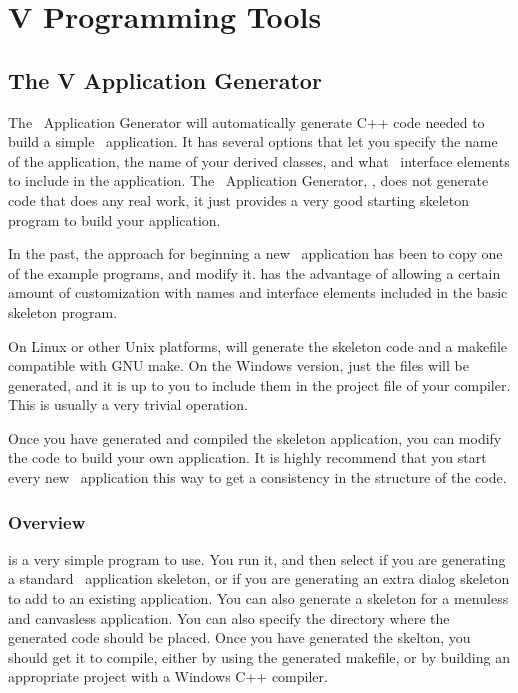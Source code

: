 
\chapter{V Programming Tools}

\section{The V Application Generator}

The \V\ Application Generator will automatically generate
C++ code needed to build a simple \V\ application. It has
several options that let you specify the name of the
application, the name of your derived classes, and what
\V\ interface elements to include in the application.
The \V\ Application Generator, , does not generate code that
does any real work, it just provides a very good starting
skeleton program to build your application.

In the past, the approach for beginning a new \V\ application
has been to copy one of the example programs, and modify
it.  has the advantage of allowing a certain amount
of customization with names and interface elements included
in the basic skeleton program.

On Linux or other Unix platforms,  will generate
the skeleton code and a makefile compatible with GNU make.
On the Windows version, just the files will be generated,
and it is up to you to include them in the project file
of your compiler. This is usually a very trivial operation.

Once you have generated and compiled the skeleton application,
you can modify the code to build your own application. It
is highly recommend that you start every new \V\ application
this way to get a consistency in the structure of the code.

\subsection{Overview}

 is a very simple program to use. You run it,
and then select if you are generating a standard \V\
application skeleton, or if you are generating an
extra dialog skeleton to add to an existing application.
You can also generate a skeleton for a menuless and
canvasless \V application. You can also specify the
directory where the generated code should be placed.
Once you have generated the skelton, you should get it
to compile, either by using the generated makefile, or
by building an appropriate project with a Windows C++
compiler.

